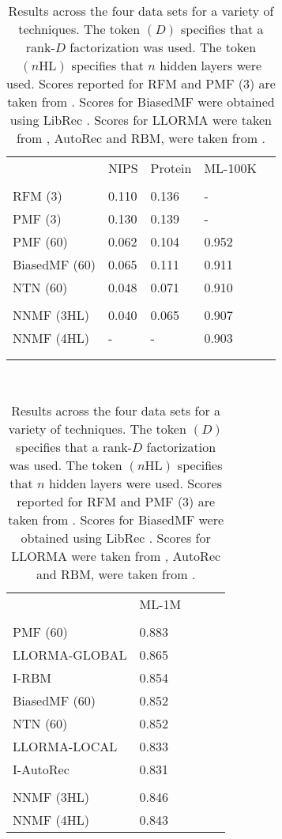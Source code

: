 \documentclass{article} \usepackage{iclr2016_conference,times}
\begin{document}
\begin{table}[t]
\centering
\begin{tabular}{lllll}
              & NIPS  & Protein & ML-100K \\
              & \\
RFM (3)          & 0.110 & 0.136   & -           \\  PMF (3)          &  0.130 &  0.139   & -     \\  PMF (60)          & 0.062 & 0.104   & 0.952    \\  BiasedMF  (60)     &  0.065    & 0.111        & 0.911  \\   NTN (60)               & 0.048 & 0.071 & 0.910 \\ \vspace*{-.75em}& \\      
NNMF (3HL)          & 0.040 & 0.065   & 0.907 \\    NNMF (4HL)          & - & -  & 0.903    \\ & 
\\ & \\
\end{tabular}\ \ \ \ 
\begin{tabular}{lllll}
              & ML-1M \\
              & \\
PMF (60)               &  0.883 \\ LLORMA-GLOBAL    & 0.865 \\  I-RBM                        &0.854 \\   BiasedMF (60)     & 0.852 \\  NTN (60)                   & 0.852  \\ LLORMA-LOCAL       & 0.833 \\  I-AutoRec                  & 0.831 \\  \vspace*{-.75em}& \\      
NNMF (3HL)                        & 0.846   \\ NNMF (4HL)			& 0.843
\end{tabular}
\caption{Results across the four data sets for a variety of techniques.  
The token $(D)$ specifies that a rank-$D$ factorization was used. 
The token $(n \mathrm{HL})$ specifies that $n$ hidden layers were used. Scores reported for RFM and PMF (3) are taken from \citep{RFMLloyd}.  Scores for BiasedMF were obtained using LibRec \citep{LibRec}. Scores for LLORMA were taken from  \citep{LLORMA}, AutoRec and RBM, were taken from \citep{AutoRec}.}
\label{resultstable}
\end{table}
\end{document}
